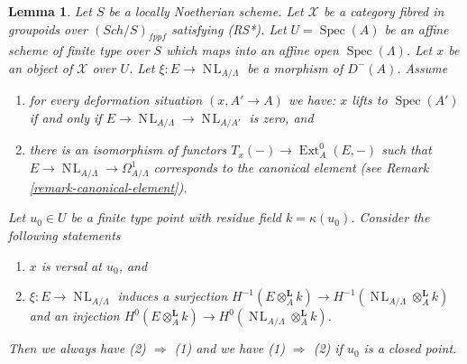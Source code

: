 \documentclass{stacks-project}
\theoremstyle{plain}
\newtheorem{lemma}[subsection]{Lemma}
\theoremstyle{definition}
\theoremstyle{remark}
\numberwithin{equation}{subsection}
\def\Spec{\mathop{\mathrm{Spec}}}
\def\Ext{\mathop{\mathrm{Ext}}\nolimits}
\def\Sch{\mathit{Sch}}
\def\NL{\mathop{N\!L}\nolimits}
\begin{document}
\begin{lemma}
\label{lemma-characterize-versal}
Let $S$ be a locally Noetherian scheme. Let $\mathcal{X}$ be a category
fibred in groupoids over $(\Sch/S)_{fppf}$ satisfying (RS*).
Let $U = \Spec(A)$ be an
affine scheme of finite type over $S$ which maps into an affine open
$\Spec(\Lambda)$. Let $x$ be an object of $\mathcal{X}$ over $U$.
Let $\xi : E \to \NL_{A/\Lambda}$ be a morphism of $D^{-}(A)$. Assume
\begin{enumerate}
\item[(i)] for every deformation situation $(x, A' \to A)$ we have:
$x$ lifts to $\Spec(A')$ if and only if
$E \to \NL_{A/\Lambda} \to \NL_{A/A'}$ is zero, and
\item[(ii)] there is an isomorphism of functors
$T_x(-) \to \Ext^0_A(E, -)$
such that $E \to \NL_{A/\Lambda} \to \Omega^1_{A/\Lambda}$
corresponds to the canonical element (see
Remark \ref{remark-canonical-element}).
\end{enumerate}
Let $u_0 \in U$ be a finite type point with residue field
$k = \kappa(u_0)$. Consider the following statements
\begin{enumerate}
\item $x$ is versal at $u_0$, and
\item $\xi : E \to \NL_{A/\Lambda}$ induces a surjection
$H^{-1}(E \otimes_A^{\mathbf{L}} k) \to
H^{-1}(\NL_{A/\Lambda} \otimes_A^{\mathbf{L}} k)$
and an injection
$H^0(E \otimes_A^{\mathbf{L}} k) \to
H^0(\NL_{A/\Lambda} \otimes_A^{\mathbf{L}} k)$.
\end{enumerate}
Then we always have (2) $\Rightarrow$ (1) and we have (1) $\Rightarrow$ (2)
if $u_0$ is a closed point.
\end{lemma}
\end{document}
